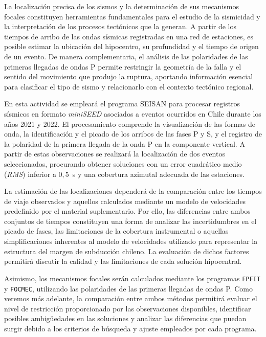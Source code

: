 \documentclass[a4paper,12pt]{article} %
\numberwithin{equation}{section} %
\numberwithin{figure}{section} %
\begin{document}
La localización precisa de los sismos y la determinación de sus mecanismos focales constituyen herramientas fundamentales para el estudio de la sismicidad y la interpretación de los procesos tectónicos que la generan. A partir de los tiempos de arribo de las ondas sísmicas registradas en una red de estaciones, es posible estimar la ubicación del hipocentro, su profundidad y el tiempo de origen de un evento. De manera complementaria, el análisis de las polaridades de las primeras llegadas de ondas P permite restringir la geometría de la falla y el sentido del movimiento que produjo la ruptura, aportando información esencial para clasificar el tipo de sismo y relacionarlo con el contexto tectónico regional.

En esta actividad se empleará el programa SEISAN para procesar registros sísmicos en formato \textit{miniSEED} asociados a eventos ocurridos en Chile durante los años 2021 y 2022. El procesamiento comprende la visualización de las formas de onda, la identificación y el picado de los arribos de las fases P y S, y el registro de la polaridad de la primera llegada de la onda P en la componente vertical. A partir de estas observaciones se realizará la localización de dos eventos seleccionados, procurando obtener soluciones con un error cuadrático medio (\textit{RMS}) inferior a $0{,}5$~s y una cobertura azimutal adecuada de las estaciones.

La estimación de las localizaciones dependerá de la comparación entre los tiempos de viaje observados y aquellos calculados mediante un modelo de velocidades predefinido por el material suplementario. Por ello, las diferencias entre ambos conjuntos de tiempos constituyen una forma de analizar las incertidumbres en el picado de fases, las limitaciones de la cobertura instrumental o aquellas simplificaciones inherentes al modelo de velocidades utilizado para representar la estructura del margen de subducción chileno. La evaluación de dichos factores permitirá discutir la calidad y las limitaciones de cada solución hipocentral.

Asimismo, los mecanismos focales serán calculados mediante los programas \texttt{FPFIT} y \texttt{FOCMEC}, utilizando las polaridades de las primeras llegadas de ondas P. Como veremos más adelante, la comparación entre ambos métodos permitirá evaluar el nivel de restricción proporcionado por las observaciones disponibles, identificar posibles ambigüedades en las soluciones y analizar las diferencias que puedan surgir debido a los criterios de búsqueda y ajuste empleados por cada programa.
\end{document}
